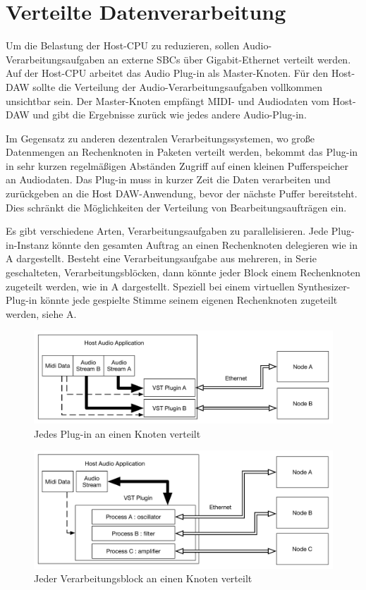 \section{Verteilte Datenverarbeitung}

Um die Belastung der Host-CPU zu reduzieren, sollen Audio-Verarbeitungsaufgaben an externe SBCs über Gigabit-Ethernet verteilt werden. Auf der Host-CPU arbeitet das Audio Plug-in als Master-Knoten. Für den Host-DAW sollte die Verteilung der Audio-Verarbeitungsaufgaben vollkommen unsichtbar sein. Der Master-Knoten empfängt MIDI- und Audiodaten vom Host-DAW und gibt die Ergebnisse zurück wie jedes andere Audio-Plug-in.

Im Gegensatz zu anderen dezentralen Verarbeitungssystemen, wo große Datenmengen an Rechenknoten in Paketen verteilt werden, bekommt das Plug-in in sehr kurzen regelmäßigen Abständen  Zugriff auf einen kleinen Pufferspeicher an Audiodaten. Das Plug-in muss in kurzer Zeit die Daten verarbeiten und zurückgeben an die Host DAW-Anwendung, bevor der nächste Puffer bereitsteht. Dies schränkt die Möglichkeiten  der Verteilung von Bearbeitungsaufträgen ein.

Es gibt verschiedene Arten, Verarbeitungsaufgaben zu parallelisieren. Jede Plug-in-Instanz könnte den gesamten Auftrag an einen Rechenknoten delegieren wie in A dargestellt. Besteht eine Verarbeitungsaufgabe aus mehreren, in Serie geschalteten, Verarbeitungsblöcken, dann könnte jeder Block einem Rechenknoten zugeteilt werden, wie in A dargestellt. Speziell bei einem virtuellen Synthesizer-Plug-in könnte jede gespielte Stimme seinem eigenen Rechenknoten zugeteilt werden, siehe A.

\begin{figure}[H]
    \centering
    \includegraphics[width=\textwidth]{assets/distribution_1to1.pdf}
    \caption{Jedes Plug-in an einen Knoten verteilt}
    \label{fig:one_to_one}
\end{figure}

\begin{figure}[H]
    \centering
    \includegraphics[width=\textwidth]{assets/distribution_perprocessor.pdf}
    \caption{Jeder Verarbeitungsblock an einen Knoten verteilt}
    \label{fig:perproccessor}
\end{figure}

